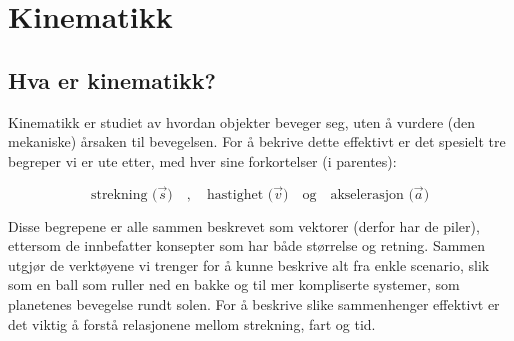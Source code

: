 \chapter{Kinematikk}
\label{Chapter:kinematikk}


\section{Hva er kinematikk?}
Kinematikk er studiet av hvordan objekter beveger seg, uten å vurdere (den mekaniske) årsaken til bevegelsen. For å bekrive dette effektivt er det spesielt tre begreper vi er ute etter, med hver sine forkortelser (i parentes):

\[\textrm{strekning ($\vec{s}$)}\quad,\quad\textrm{hastighet ($\vec{v}$)}\quad\textrm{og}\quad\textrm{akselerasjon ($\vec{a}$)}\]

Disse begrepene er alle sammen beskrevet som vektorer (derfor har de piler), ettersom de innbefatter konsepter som har både størrelse og retning. Sammen utgjør de verktøyene vi trenger for å kunne beskrive alt fra enkle scenario, slik som en ball som ruller ned en bakke og til mer kompliserte systemer, som planetenes bevegelse rundt solen. For å beskrive slike sammenhenger effektivt er det viktig å forstå relasjonene mellom strekning, fart og tid.

